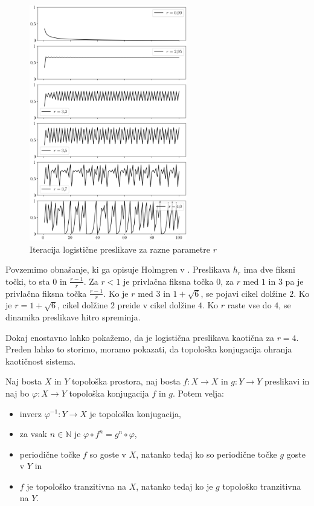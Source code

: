 \documentclass{isrmdelo}
\newcommand{\N}{\mathbb N}
\begin{document}
\begin{figure}[h!]
\begin{center}
\includegraphics[width=0.6125\textwidth]{img/logistic_iteration.png}
\end{center}
\caption{Iteracija logistične preslikave za razne parametre $r$}
\label{fig:logistic-plot}
\end{figure}

\medskip

Povzemimo obnašanje, ki ga opisuje Holmgren v \cite{holmgren96}. Preslikava $h_r$ ima dve fiksni točki, to sta $0$ in $\frac{r-1}{r}$. Za $r < 1$ je privlačna fiksna točka $0$, za $r$ med $1$ in $3$ pa je privlačna fiksna točka $\frac{r-1}{r}$. Ko je $r$ med $3$ in $1+\sqrt{6}$, se pojavi cikel dolžine $2$. Ko je $r = 1+\sqrt{6}$, cikel dolžine $2$ preide v cikel dolžine $4$. Ko $r$ raste vse do $4$, se dinamika preslikave hitro spreminja.

\medskip

Dokaj enostavno lahko pokažemo, da je logistična preslikava kaotična za $r = 4$. Preden lahko to storimo, moramo pokazati, da topološka konjugacija ohranja kaotičnost sistema.

\begin{trditev}
\label{trditev:konjugacija-ohranjanje}
Naj bosta $X$ in $Y$ topološka prostora, naj bosta $f: X \rightarrow X$ in $g: Y \rightarrow Y$ preslikavi in naj bo $\varphi: X \rightarrow Y$ topološka konjugacija $f$ in $g$. Potem velja:
\begin{itemize}
    \item inverz $\varphi^{-1}: Y \rightarrow X$ je topološka konjugacija,
    \item za vsak $n \in \N$ je $\varphi \circ f^n = g^n \circ \varphi$,
    \item periodične točke $f$ so goste v $X$, natanko tedaj ko so periodične točke $g$ goste v $Y$ in
    \item $f$ je topološko tranzitivna na $X$, natanko tedaj ko je $g$ topološko tranzitivna na $Y$.
\end{itemize}
\end{trditev}
\end{document}
